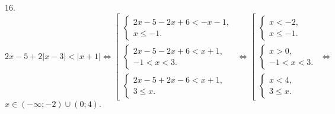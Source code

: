 16. $2x-5+2|x-3|<|x+1|\Leftrightarrow \left[\begin{array}{l} \begin{cases} 2x-5-2x+6< -x-1,\\
x\leqslant-1.\end{cases}\\ \begin{cases} 2x-5-2x+6< x+1,\\ -1<x<3.\end{cases} \\ \begin{cases} 2x-5+2x-6< x+1,\\ 3\leqslant x.\end{cases}\end{array}\right.
\Leftrightarrow \left[\begin{array}{l} \begin{cases} x< -2,\\
x\leqslant-1.\end{cases}\\ \begin{cases} x> 0,\\ -1<x<3.\end{cases} \\ \begin{cases} x<4,\\ 3\leqslant x.\end{cases}\end{array}\right.
\Leftrightarrow$\\$ x\in (-\infty;-2)\cup(0;4).$\\
